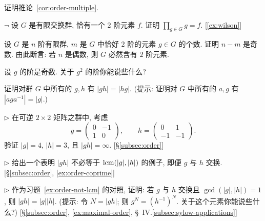\begin{prob}
\label{ex:corollary-1-11}
证明推论~\ref{cor:order-multiple}.
\end{prob}

\begin{prob}
\label{ex:unique-order-2}
$\neg$ 设 $G$ 是有限交换群, 恰有一个 $2$ 阶元素 $f$. 证明 $\prod_{g \in G} g = f$. [\ref{ex:wilson}]
\end{prob}

\begin{prob}
\label{ex:order-2-parity}
设 $G$ 是 $n$ 阶有限群, $m$ 是 $G$ 中恰好 $2$ 阶的元素 $g \in G$ 的个数. 证明 $n - m$ 是奇数. 由此断言: 若 $n$ 是偶数, 则 $G$ 必然含有 $2$ 阶元素.
\end{prob}

\begin{prob}
\label{ex:order-g-squared}
设 $g$ 的阶是奇数. 关于 $g^2$ 的阶你能说些什么?
\end{prob}

\begin{prob}
\label{ex:order-gh-equals-hg}
证明对群 $G$ 中所有的 $g, h$ 有 $|gh| = |hg|$. (提示: 证明对 $G$ 中所有的 $a, g$ 有 $|aga^{-1}| = |g|$.)
\end{prob}

\begin{prob}
\label{ex:order-gh-infinity}
$\triangleright$ 在可逆 $2 \times 2$ 矩阵之群中, 考虑
\[
g = \begin{pmatrix} 0 & -1 \\ 1 & 0 \end{pmatrix}, \qquad h = \begin{pmatrix} 0 & 1 \\ -1 & -1 \end{pmatrix}.
\]
验证 $|g| = 4$, $|h| = 3$, 且 $|gh| = \infty$. [\S\ref{subsec:order}]
\end{prob}

\begin{prob}
\label{ex:order-not-lcm}
$\triangleright$ 给出一个表明 $|gh|$ 不必等于 $\operatorname{lcm}(|g|, |h|)$ 的例子, 即便 $g$ 与 $h$ 交换. [\S\ref{subsec:order}, \ref{ex:order-coprime}]
\end{prob}

\begin{prob}
\label{ex:order-coprime}
$\triangleright$ 作为习题~\ref{ex:order-not-lcm} 的对照, 证明: 若 $g$ 与 $h$ 交换且 $\gcd(|g|, |h|) = 1$, 则 $|gh| = |g||h|$. (提示: 令 $N = |gh|$; 则 $g^N = (h^{-1})^N$. 关于这个元素你能说些什么?) [\S\ref{subsec:order}, \ref{ex:maximal-order}, \S~IV.\ref{subsec:sylow-applications}]
\end{prob}

